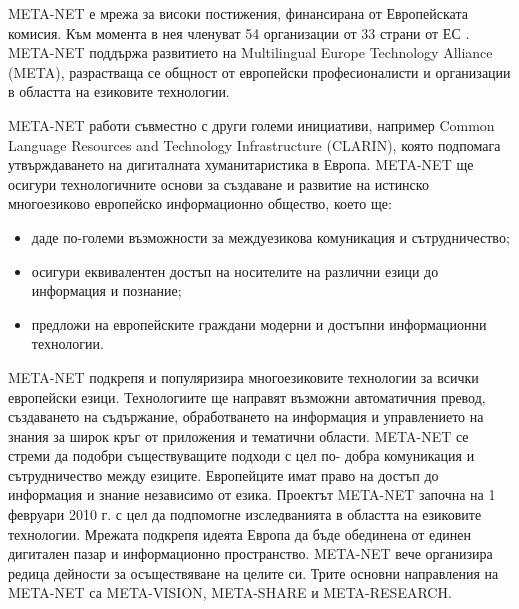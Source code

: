 \documentclass[]{../../metanetpaper}
\begin{document}
\begin{multicols}{2}

  META-NET е мрежа за високи постижения, финансирана от Европейската
  комисия. Към момента в нея членуват 54 организации от 33 страни от
  ЕС \cite{rehm2011}. META-NET поддържа развитието
  на Multilingual Europe Technology Alliance
  (META), разрастваща се общност от
  европейски професионалисти и организации в областта на езиковите
  технологии.

META-NET работи съвместно с други големи инициативи, например Common Language Resources and Technology Infrastructure (CLARIN), която подпомага утвърждаването на дигиталната хуманитаристика в Европа. META-NET ще осигури  технологичните основи за създаване и развитие на истинско многоезиково европейско информационно общество, което ще:

\begin{itemize}
\item даде по-големи възможности за междуезикова комуникация и сътрудничество;
\item осигури еквивалентен достъп на носителите на различни езици до информация и познание;
\item предложи на европейските граждани модерни и достъпни информационни
 технологии.
\end{itemize}

META-NET подкрепя и популяризира многоезиковите технологии за всички
европейски езици. Технологиите ще направят възможни автоматичния
превод, създаването на съдържание, обработването на информация и
управлението на знания за широк кръг от приложения и тематични
области. META-NET се стреми да подобри съществуващите подходи с цел
по- добра комуникация и сътрудничество между езиците.  Европейците
имат право на достъп до информация и знание независимо от езика.
%
Проектът META-NET започна на 1 февруари 2010 г. с цел да подпомогне
изследванията в областта на езиковите технологии. Мрежата подкрепя
идеята Европа да бъде обединена от единен дигитален пазар и
информационно пространство. META-NET вече организира редица дейности
за осъществяване на целите си. Трите основни направления на META-NET
са META-VISION, META-SHARE и META-RESEARCH.


\end{multicols}
\end{document}

